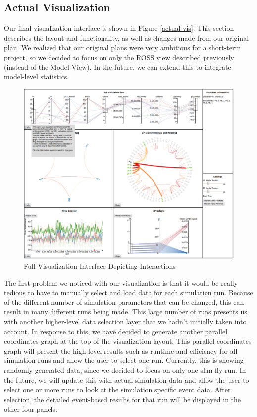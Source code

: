 \documentclass{acm_proc_article-sp}
\begin{document}
\subsection{Actual Visualization}
Our final visualization interface is shown in Figure \ref{actual-vis}.  This section describes the layout and functionality, as well as changes made from our original plan.  We realized that our original plans were very ambitious for a short-term project, so we decided to focus on only the ROSS view described previously (instead of the Model View).  In the future, we can extend this to integrate model-level statistics.  

\begin{figure}[t]
\centering
   \includegraphics[width=6.5in]{Interactive.png}
\caption{Full Visualization Interface Depicting Interactions}
\label{interact-vis}
\end{figure}

The first problem we noticed with our visualization is that it would be really tedious to have to manually select and load data for each simulation run.  Because of the different number of simulation parameters that can be changed, this can result in many different runs being made.  This large number of runs presents us with another higher-level data selection layer that we hadn't initially taken into account.  In response to this, we have decided to generate another parallel coordinates graph at the top of the visualization layout. This parallel coordinates graph will present the high-level results such as runtime and efficiency for all simulation runs and allow the user to select one run. Currently, this is showing randomly generated data, since we decided to focus on only one slim fly run.  In the future, we will update this with actual simulation data and allow the user to select one or more runs to look at the simulation specific event data. After selection, the  detailed event-based results for that run will be displayed in the other four panels.
\end{document}
